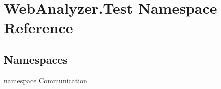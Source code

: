 \hypertarget{namespace_web_analyzer_1_1_test}{}\section{Web\+Analyzer.\+Test Namespace Reference}
\label{namespace_web_analyzer_1_1_test}
\subsection*{Namespaces}
\begin{DoxyCompactItemize}
\item 
namespace \hyperlink{namespace_web_analyzer_1_1_test_1_1_communication}{Communication}
\end{DoxyCompactItemize}
